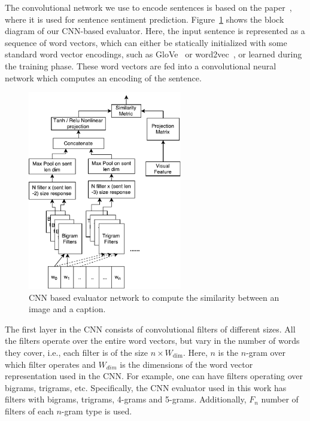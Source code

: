 The convolutional network we use to encode sentences is based on the
paper~\cite{kim:2014:CNNsent}, where it is used for sentence sentiment
prediction.
Figure~\ref{fig:CNNEval} shows the block diagram of our CNN-based evaluator.  
Here, the input sentence is represented as a sequence of word vectors, which can
either be statically initialized with some standard word vector encodings, such
as GloVe~\cite{pennington2014glove} or word2vec~\cite{mikolov2013distributed},
or learned during the training phase.
These word vectors are fed into a convolutional neural network which computes an
encoding of the sentence.


\begin{figure}[t] 
  \centering
  \includegraphics[width=0.6\textwidth]{./images/CnnEval.pdf} 
  \caption{CNN based evaluator network to compute the similarity between 
    an image and a caption.}
  \label{fig:CNNEval} 
\end{figure}


The first layer in the CNN consists of convolutional filters of different sizes.  
All the filters operate over the entire word vectors, but vary in the number of
words they cover, i.e., each filter is of the size $n \times
W_{\text{dim}}$. 
Here, $n$ is the $n$-gram over which filter operates and $W_{dim}$ is the
dimensions of the word vector representation used in the CNN.
For example, one can have filters operating over bigrams, trigrams, etc.
Specifically, the CNN evaluator used in this work has filters with bigrams,
trigrams, 4-grams and 5-grams. 
Additionally, $F_n$ number of filters of each $n$-gram type is used.

